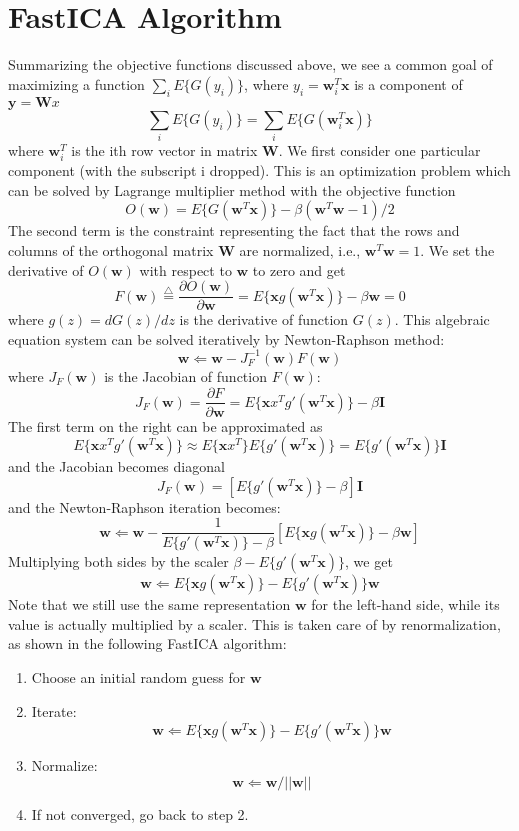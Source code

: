 \section*{FastICA Algorithm}

Summarizing the objective functions discussed above, we see a common goal of
maximizing a function $\sum_i E\{ G(y_i) \}$, where $y_i={\mathbf w}_i^T
{\mathbf x}$ is a component of ${\mathbf y}={\mathbf Wx}$
\[	\sum_i E\{ G(y_i) \}=\sum_i E\{ G( {\mathbf w}_i^T {\mathbf x} ) \}	\]
where ${\mathbf w}_i^T$ is the ith row vector in matrix ${\mathbf W}$. We first
consider one particular component (with the subscript i dropped). This is an
optimization problem which can be solved by Lagrange multiplier method with
the objective function
\[	O({\mathbf w})=E\{ G( {\mathbf w}^T {\mathbf x} ) \}
	-\beta( {\mathbf w}^T{\mathbf w}-1)/2	\]
The second term is the constraint representing the fact that the rows and
columns of the orthogonal matrix ${\mathbf W}$ are normalized, i.e.,
${\mathbf w}^T{\mathbf w}=1$. We set the derivative of $O({\mathbf w})$ with
respect to ${\mathbf w}$ to zero and get
\[	F({\mathbf w})\stackrel{\triangle}{=}
	\frac{\partial O({\mathbf w})}{ \partial {\mathbf w}}
	=E\{ {\mathbf x}g( {\mathbf w}^T {\mathbf x} ) \}-\beta {\mathbf w}=0	\]
where $g(z)=dG(z)/dz$ is the derivative of function $G(z)$. This algebraic
equation system can be solved iteratively by Newton-Raphson method:
\[ {\mathbf w} \Leftarrow {\mathbf w}-J_F^{-1}({\mathbf w}) F({\mathbf w}) \]
where $J_F({\mathbf w})$ is the Jacobian of function $F({\mathbf w})$:
\[
J_F({\mathbf w})=\frac{\partial F}{\partial {\mathbf w}}=
E\{{\mathbf xx}^T g'({\mathbf w}^T{\mathbf x})\}-\beta{\mathbf I}
\]
The first term on the right can be approximated as
\[ E\{{\mathbf xx}^T g'({\mathbf w}^T{\mathbf x})\}
	\approx E\{{\mathbf xx}^T\} E\{g'({\mathbf w}^T{\mathbf x})\}
	=E\{g'({\mathbf w}^T{\mathbf x})\} {\mathbf I}
\]
and the Jacobian becomes diagonal
\[ J_F({\mathbf w})=[E\{g'({\mathbf w}^T{\mathbf x})\}-\beta] {\mathbf I} \]
and the Newton-Raphson iteration becomes:
\[ {\mathbf w} \Leftarrow {\mathbf w}-\frac{1}{E\{g'({\mathbf w}^T{\mathbf x})\}-\beta}[E\{ {\mathbf x}g( {\mathbf w}^T {\mathbf x} ) \}-\beta {\mathbf w}]
	\]
Multiplying both sides by the scaler $\beta-E\{g'({\mathbf w}^T{\mathbf x})\}$,
we get
\[ {\mathbf w} \Leftarrow E\{ {\mathbf x}g( {\mathbf w}^T {\mathbf x} ) \}
-E\{g'({\mathbf w}^T{\mathbf x})\} {\mathbf w}	\]
Note that we still use the same representation ${\mathbf w}$ for the
left-hand side, while its value is actually multiplied by a scaler. This is
taken care of by renormalization, as shown in the following FastICA algorithm:
\begin{enumerate}
\item Choose an initial random guess for ${\mathbf w}$
\item Iterate:
\[ {\mathbf w} \Leftarrow E\{ {\mathbf x}g( {\mathbf w}^T {\mathbf x} ) \}
	-E\{g'({\mathbf w}^T{\mathbf x})\} {\mathbf w}	\]
\item Normalize:
	\[ {\mathbf w} \Leftarrow {\mathbf w}/||{\mathbf w}||	\]
\item If not converged, go back to step 2.
\end{enumerate}

